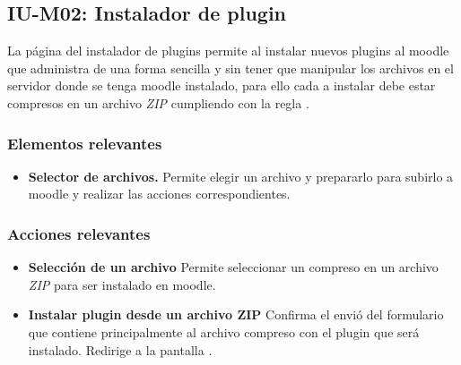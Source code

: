 
\subsection{IU-M02: Instalador de plugin}

 La página del instalador de plugins permite al  instalar nuevos plugins al 
 moodle que administra de una forma sencilla y sin tener que manipular los archivos en el servidor
 donde se tenga moodle instalado, para ello cada  a instalar debe estar
 compresos en un archivo {\it ZIP} cumpliendo con la regla .



\subsubsection{Elementos relevantes}

    \begin{itemize}
    \item {\bf Selector de archivos.}
        Permite elegir un archivo y prepararlo para subirlo a moodle
        y realizar las acciones correspondientes.
    \end{itemize}

\subsubsection{Acciones relevantes}

    \begin{itemize}
    \item {\bf Selección de un archivo}
        Permite seleccionar un  compreso en un archivo {\it ZIP} para
        ser instalado en moodle.

    \item {\bf Instalar plugin desde un archivo ZIP}
        Confirma el envió del formulario que contiene principalmente al archivo compreso con 
        el plugin que será instalado. Redirige a la pantalla .
    \end{itemize}

\clearpage
